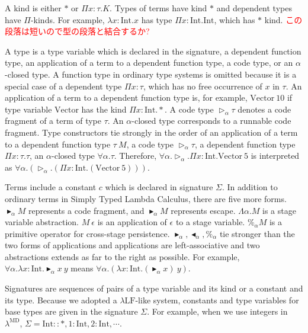 \documentclass[runningheads]{llncs}
\newcommand{\red}[1]{\textcolor{red}{#1 }}
\newcommand{\LMD}{$\lambda^{\textrm{MD}}$\xspace}
\newcommand{\LLF}{$\lambda\textrm{LF}$\xspace}
\newcommand{\TW}{\triangleright}
\newcommand{\F}{\forall}
\newcommand{\TB}{\blacktriangleright}
\newcommand{\TBL}{\blacktriangleleft}
\newcommand{\I}{\textrm{Int}}
\begin{document}

A kind is either $*$ or $\Pi x:\tau.K$.
Types of terms have kind $*$ and dependent types have $\Pi$-kinds.
For example, $\lambda x:\I.x$ has type $\Pi x:\I.\I$, which has $*$ kind.
\red{この段落は短いので型の段落と結合するか?}


A type is a type variable which is declared in the signature, a dependent function type,
an application of a term to a dependent function type, a code type, or an $\alpha$-closed type.
A function type in ordinary type systems is omitted 
because it is a special case of a dependent type $\Pi x:\tau$, which has no free occurrence of $x$  in $\tau$.
An application of a term to a dependent function type is, for example, $\text{Vector}\ 10$
if type variable $\text{Vector}$ has the kind $\Pi x:\I.*$.
A code type $\TW_\alpha \tau$ denotes a code fragment of a term of type $\tau$.
An $\alpha$-closed type corresponds to a runnable code fragment.
Type constructors tie strongly in the order of 
an application of a term to a dependent function type $\tau\ M$,
a code type $\TW_{\alpha} \tau$,
a dependent function type $\Pi x:\tau.\tau$, 
an $\alpha$-closed type $\F\alpha.\tau$.
Therefore, $\F\alpha.\TW_{\alpha}.\Pi x:\I.\text{Vector}\ 5$ is interpreted as
$\F\alpha.(\TW_{\alpha}.(\Pi x:\I.(\text{Vector}\ 5)))$.


Terms include a constant $c$ which is declared in signature $\Sigma$.
In addition to ordinary terms in Simply Typed Lambda Calculus, there are five more forms.
$\TB_\alpha M$ represents a code fragment, and $\TB_\alpha M$ represents escape.
$\Lambda\alpha.M$ is a stage variable abstraction.
$M\ \epsilon$ is an application of $\epsilon$ to a stage variable.
$\%_\alpha M$ is a primitive operator for cross-stage persistence.
$\TB_\alpha, \TBL_\alpha, \%_\alpha$ tie stronger than the two forms of applications
and applications are left-associative
and two abstractions extends as far to the right as possible.
For example, $\F\alpha.\lambda x:\I.\TB_\alpha x\ y$ means $\F\alpha.(\lambda x:\I.(\TB_\alpha x)\ y)$.


Signatures are sequences of pairs of a type variable and its kind or a constant and its type.
Because we adopted a \LLF-like system, constants and type variables for base types are given in the signature $\Sigma$.
For example, when we use integers in \LMD, $\Sigma = \I :: *, 1:\I, 2:\I, \cdots$.
\end{document}
